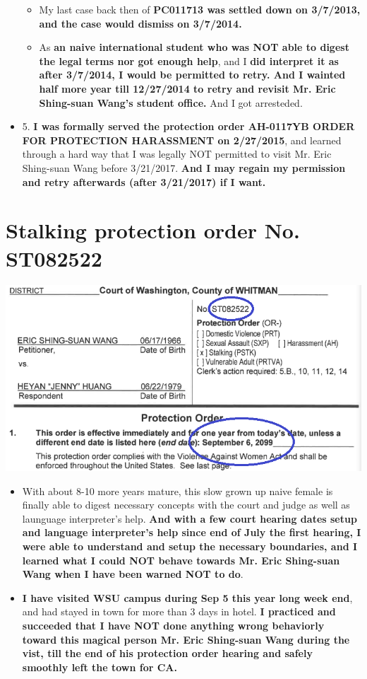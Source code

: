 \documentclass[9pt, b5paper]{article}
\begin{document}
\begin{itemize}
\begin{itemize}
\item My last case back then of \textbf{PC011713 was settled down on 3/7/2013, and the case would dismiss on 3/7/2014.}
\item As \textbf{an naive international student who was NOT able to digest the legal terms nor got enough help}, and I \textbf{did interpret it as after 3/7/2014, I would be permitted to retry. And I wainted half more year till 12/27/2014 to retry and revisit Mr. Eric Shing-suan Wang's student office.} And I got arresteded.
\end{itemize}
\item 5. \textbf{I was formally served the protection order AH-0117YB ORDER FOR PROTECTION HARASSMENT on 2/27/2015}, and learned through a hard way that I was legally NOT permitted to visit Mr. Eric Shing-suan Wang before 3/21/2017. \textbf{And I may regain my permission and retry afterwards (after 3/21/2017) if I want.}
\end{itemize}

\section{Stalking protection order No. ST082522}
\label{sec-5}

\includegraphics[width=.9\linewidth]{./pic/dearCousin_20220919_222725.png}
\begin{itemize}
\item With about 8-10 more years mature, this slow grown up naive female is finally able to digest necessary concepts with the court and judge as well as launguage interpreter's help. \textbf{And with a few court hearing dates setup and language interpreter's help since end of July the first hearing, I were able to understand and setup the necessary boundaries, and I learned what I could NOT behave towards Mr. Eric Shing-suan Wang when I have been warned NOT to do}.
\item \textbf{I have visited WSU campus during Sep 5 this year long week end}, and had stayed in town for more than 3 days in hotel. \textbf{I practiced and succeeded that I have NOT done anything wrong behaviorly toward this magical person Mr. Eric Shing-suan Wang during the vist, till the end of his protection order hearing and safely smoothly left the town for CA.}
\end{itemize}
\end{document}
